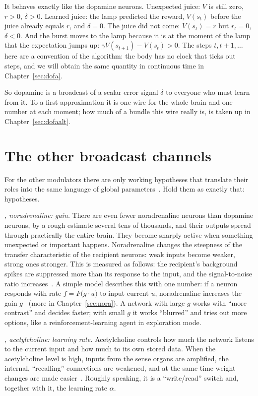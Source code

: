 It behaves exactly like the dopamine neurons. Unexpected juice: $V$ is still zero, $r>0$, $\delta>0$. Learned juice: the lamp predicted the reward, $V(s_t)$ before the juice already equals $r$, and $\delta=0$. The juice did not come: $V(s_t)=r$ but $r_t=0$, $\delta<0$. And the burst moves to the lamp because it is at the moment of the lamp that the expectation jumps up: $\gamma V(s_{t+1})-V(s_t)>0$. The steps $t,t+1,\dots$ here are a convention of the algorithm: the body has no clock that ticks out steps, and we will obtain the same quantity in continuous time in Chapter~\ref{sec:dofa}.

So dopamine is a broadcast of a scalar error signal $\delta$ to everyone who must learn from it. To a first approximation it is one wire for the whole brain and one number at each moment; how much of a bundle this wire really is, is taken up in Chapter~\ref{sec:dofaalt}.

\section{The other broadcast channels}

For the other modulators there are only working hypotheses that translate their roles into the same language of global parameters~\cite{Doya2002}. Hold them as exactly that: hypotheses.

\emph{, noradrenaline: gain.} There are even fewer noradrenaline neurons than dopamine neurons, by a rough estimate several tens of thousands, and their outputs spread through practically the entire brain. They become sharply active when something unexpected or important happens. Noradrenaline changes the steepness of the transfer characteristic of the recipient neurons: weak inputs become weaker, strong ones stronger. This is measured as follows: the recipient's background spikes are suppressed more than its response to the input, and the signal-to-noise ratio increases~\cite{Foote1975NE}. A simple model describes this with one number: if a neuron responds with rate $f=F\bigl(g\cdot u\bigr)$ to input current $u$, noradrenaline increases the gain $g$~\cite{AstonJones2005} (more in Chapter~\ref{sec:nora}). A network with large $g$ works with ``more contrast'' and decides faster; with small $g$ it works ``blurred'' and tries out more options, like a reinforcement-learning agent in exploration mode.

\emph{, acetylcholine: learning rate.} Acetylcholine controls how much the network listens to the current input and how much to its own stored data. When the acetylcholine level is high, inputs from the sense organs are amplified, the internal, ``recalling'' connections are weakened, and at the same time weight changes are made easier~\cite{Hasselmo2006}. Roughly speaking, it is a ``write/read'' switch and, together with it, the learning rate $\alpha$.

